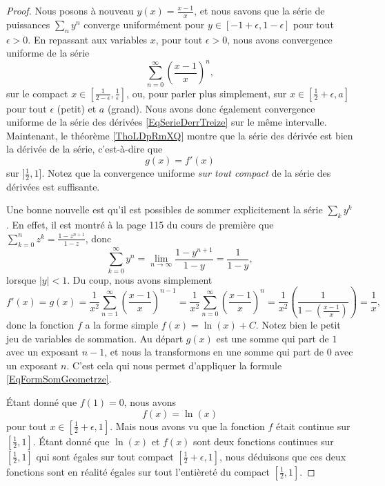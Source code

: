 \begin{proof}
	Nous posons à nouveau \( y(x)=\frac{ x-1 }{ x }\), et nous savons que la série de puissances \( \sum_ny^n\) converge uniformément pour \( y\in[-1+\epsilon,1-\epsilon]\) pour tout \( \epsilon>0\). En repassant aux variables \( x\), pour tout \( \epsilon>0\), nous avons convergence uniforme de la série
	\begin{equation}
		\sum_{n=0}^{\infty} \left( \frac{ x-1 }{ x } \right)^n,
	\end{equation}
	sur le compact \( x\in[\frac{ 1 }{ 2-\epsilon },\frac{1}{ \epsilon }]\), ou, pour parler plus simplement, sur \( x\in[\frac{ 1 }{2}+\epsilon,a]\) pour tout \( \epsilon\) (petit) et \( a\) (grand). Nous avons donc également convergence uniforme de la série des dérivées \eqref{EqSerieDerrTreize} sur le même intervalle. Maintenant, le théorème \ref{ThoLDpRmXQ} montre que la série des dérivée est bien la dérivée de la série, c'est-à-dire que
	\begin{equation}
		g(x)=f'(x)
	\end{equation}
	sur \( ]\frac{ 1 }{ 2 },1]\). Notez que la convergence uniforme \emph{sur tout compact} de la série des dérivées est suffisante.

	Une bonne nouvelle est qu'il est possibles de sommer explicitement la série \( \sum_ky^k\). En effet, il est montré à la page 115 du cours de première que \( \sum_{k=0}^n z^k=\frac{ 1-z^{n+1} }{ 1-z }\), donc
	\begin{equation}		\label{EqFormSomGeometrze}
		\sum_{k=0}^{\infty}y^n=\lim_{n\to\infty}\frac{1-y^{n+1}}{ 1-y }=\frac{1}{ 1-y },
	\end{equation}
	lorsque \( | y |<1\). Du coup, nous avons simplement
	\begin{equation}
		f'(x)=g(x)=\frac{1}{ x^2 }\sum_{n=1}^{\infty}\left( \frac{ x-1 }{ x } \right)^{n-1}=\frac{1}{ x^2 }\sum_{n=0}^{\infty}\left( \frac{ x-1 }{ x } \right)^n=\frac{1}{ x^2 }\left( \frac{1}{  1-\left( \frac{ x-1 }{ x } \right)  } \right)=\frac{1}{ x },
	\end{equation}
	donc la fonction \( f\) a la forme simple \( f(x)=\ln(x)+C\). Notez bien le petit jeu de variables de sommation. Au départ \( g(x)\) est une somme qui part de \( 1\) avec un exposant \( n-1\), et nous la transformons en une somme qui part de \( 0\) avec un exposant \( n\). C'est cela qui nous permet d'appliquer la formule \eqref{EqFormSomGeometrze}.

	Étant donné que \( f(1)=0\), nous avons
	\begin{equation}
		f(x)=\ln(x)
	\end{equation}
	pour tout \( x\in[\frac{ 1 }{2}+\epsilon,1]\). Mais nous avons vu que la fonction \( f\) était continue sur \( [\frac{ 1 }{2},1]\). Étant donné que \( \ln(x)\) et \( f(x)\) sont deux fonctions continues sur \( [\frac{ 1 }{2},1]\) qui sont égales sur tout compact \( [\frac{ 1 }{2}+\epsilon,1]\), nous déduisons que ces deux fonctions sont en réalité égales sur tout l'entièreté du compact \( [\frac{ 1 }{2},1]\).


\end{proof}
